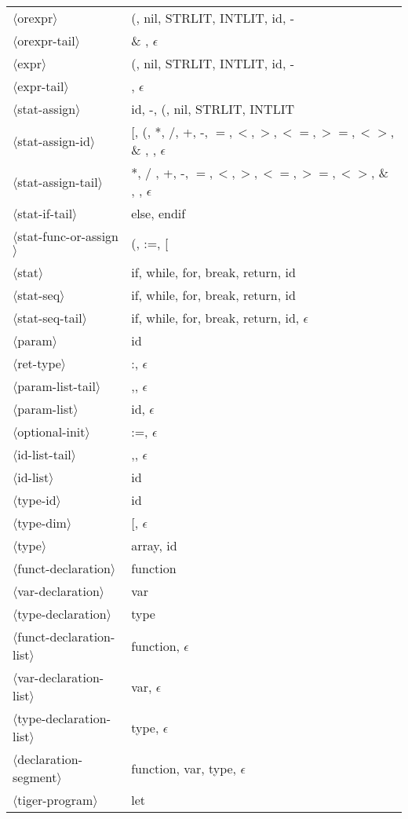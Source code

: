 \documentclass[11pt, fleqn]{article}
\newcommand{\atag}[1]{$\langle$#1$\rangle$}
\begin{document}
\begin{longtable}{l|l}
\atag{orexpr} 					&	(, nil, STRLIT, INTLIT, id, -		\\
\atag{orexpr-tail}				&	\& , $\epsilon$	\\
\atag{expr}						&	(, nil, STRLIT, INTLIT, id, -		\\
\atag{expr-tail}					&	\textbar	, $\epsilon$	\\
\atag{stat-assign}				&	id, -, (, nil, STRLIT, INTLIT	\\
\atag{stat-assign-id}			&	[, (, *, /, +, -, $=, <, >, <=, >=, <>$, \& , \textbar , $\epsilon	$\\
\atag{stat-assign-tail}			&	*, /	, +, -, $=, <, >, <=, >=, <>$, \& , \textbar , $\epsilon$	\\
\atag{stat-if-tail}				&	else, endif		\\
\atag{stat-func-or-assign}		&	(, :=, [		\\
\atag{stat}						&	if, while, for, break, return, id		\\
\atag{stat-seq}					&	if, while, for, break, return, id		\\
\atag{stat-seq-tail}				&	if, while, for, break, return, id, $\epsilon$		\\
\atag{param}						&	id		\\
\atag{ret-type}					&	:, $\epsilon	$	\\
\atag{param-list-tail}			&	,, $\epsilon$		\\
\atag{param-list}				&	id, $\epsilon$		\\
\atag{optional-init}				&	:=, $\epsilon$		\\
\atag{id-list-tail}				&	,, $\epsilon$		\\
\atag{id-list}					&	id		\\
\atag{type-id}					&	id		\\
\atag{type-dim}					&	[, $\epsilon$	\\
\atag{type}						&	array, id		\\
\atag{funct-declaration}			&	function		\\
\atag{var-declaration}			&	var \\
\atag{type-declaration}			&	type 		\\
\atag{funct-declaration-list}	&	function, $\epsilon$	\\
\atag{var-declaration-list}		&	var, $\epsilon$	\\
\atag{type-declaration-list}		&	type, $\epsilon$		\\
\atag{declaration-segment}		&	function, var, type, $\epsilon$	\\
\atag{tiger-program}				&	let				\\
\end{longtable}
\end{document}
